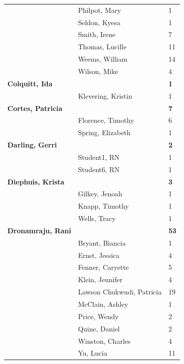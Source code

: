 \documentclass{article}\usepackage[]{graphicx}\usepackage[]{color}
\begin{document}
{\begin{longtable} { >{\raggedright}p{}|p{}p{}}
   & Philpot, Mary & 1 \\ 
   & Seldon, Kyesa & 1 \\ 
   & Smith, Irene & 7 \\ 
   \rowcolor[gray]{0.90} & Thomas, Lucille & 11 \\ 
   \rowcolor[gray]{0.90} & Weems, William & 14 \\ 
   \rowcolor[gray]{0.90} & Wilson, Mike & 4 \\ 
  \textbf{Colquitt, Ida} &  & \hspace{2cm}\textbf{1} \\ 
   & Klevering, Kristin & 1 \\ 
  \textbf{Cortes, Patricia} &  & \hspace{2cm}\textbf{7} \\ 
   \rowcolor[gray]{0.90} & Florence, Timothy & 6 \\ 
   \rowcolor[gray]{0.90} & Spring, Elizabeth & 1 \\ 
   \rowcolor[gray]{0.90}\textbf{Darling, Gerri} &  & \hspace{2cm}\textbf{2} \\ 
   & Student1, RN & 1 \\ 
   & Student6, RN & 1 \\ 
  \textbf{Diephuis, Krista} &  & \hspace{2cm}\textbf{3} \\ 
   \rowcolor[gray]{0.90} & Gilkey, Jenoah & 1 \\ 
   \rowcolor[gray]{0.90} & Knapp, Timothy & 1 \\ 
   \rowcolor[gray]{0.90} & Wells, Tracy & 1 \\ 
  \textbf{Dronamraju, Rani} &  & \hspace{2cm}\textbf{53} \\ 
   & Bryant, Biancia & 1 \\ 
   & Ernst, Jessica & 4 \\ 
   \rowcolor[gray]{0.90} & Fenner, Caryette & 5 \\ 
   \rowcolor[gray]{0.90} & Klein, Jennifer & 4 \\ 
   \rowcolor[gray]{0.90} & Lawson Chukwudi, Patricia & 19 \\ 
   & McClain, Ashley & 1 \\ 
   & Price, Wendy & 2 \\ 
   & Quine, Daniel & 2 \\ 
   \rowcolor[gray]{0.90} & Winston, Charles & 4 \\ 
   \rowcolor[gray]{0.90} & Yu, Lucia & 11 \\ 

\end{longtable}}
\end{document}
